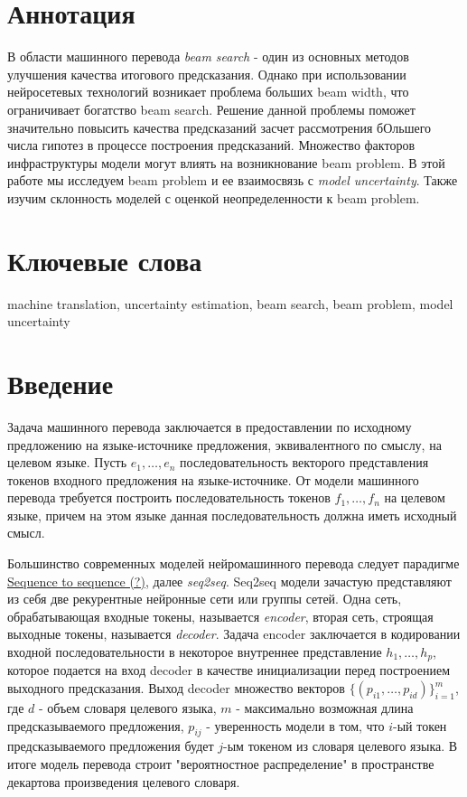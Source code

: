 \documentclass[a4paper,12pt]{article} %
\newcommand{\bibref}[3]{\hyperlink{#1}{#2 (#3)}} %
\begin{document}
	\newpage
	\section{Аннотация}
	В области машинного перевода \textit{beam search} - один из основных методов улучшения качества итогового предсказания. Однако при использовании нейросетевых технологий возникает проблема больших beam width, что ограничивает богатство beam search. Решение данной проблемы поможет значительно повысить качества предсказаний засчет рассмотрения бОльшего числа гипотез в процессе построения предсказаний. Множество факторов инфраструктуры модели могут влиять на возникнование beam problem. В этой работе мы исследуем beam problem и ее взаимосвязь с \textit{model uncertainty}. Также изучим склонность моделей с оценкой неопределенности к beam problem.
	\section{Ключевые слова}
		machine translation, uncertainty estimation, beam search, beam problem, model uncertainty
	\section{Введение}
	Задача машинного перевода заключается в предоставлении по исходному предложению на языке-источнике предложения, эквивалентного по смыслу, на целевом языке. Пусть $e_1, \dots, e_n$ последовательность векторого представления токенов входного предложения на языке-источнике. От модели машинного перевода требуется построить последовательность токенов $f_1, \dots, f_n$ на целевом языке, причем на этом языке данная последовательность должна иметь исходный смысл.
	
	Большинство современных моделей нейромашинного перевода следует парадигме \bibref{seq2seq}{Sequence to sequence}{?}, далее \textit{seq2seq}. Seq2seq модели зачастую представляют из себя две рекурентные нейронные сети или группы сетей. Одна сеть, обрабатывающая входные токены, называется \textit{encoder}, вторая сеть, строящая выходные токены, называется \textit{decoder}. Задача encoder заключается в кодировании входной последовательности в некоторое внутреннее представление $h_1, \dots, h_p$, которое подается на вход decoder в качестве инициализации перед построением выходного предсказания. Выход decoder множество векторов $\{(p_{i1}, \dots, p_{id})\}_{i=1}^{m}$, где $d$ - объем словаря целевого языка, $m$ - максимально возможная длина предсказываемого предложения, $p_{ij}$ - уверенность модели в том, что $i$-ый токен предсказываемого предложения будет $j$-ым токеном из словаря целевого языка. В итоге модель перевода строит "вероятностное распределение" в пространстве декартова произведения целевого словаря.
	
\end{document}
